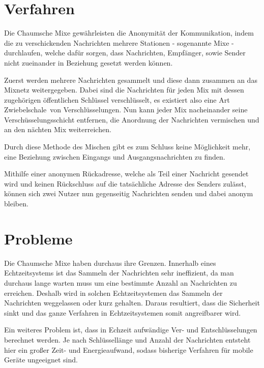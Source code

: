 \documentclass[
    fontsize=12pt,
    headings=small,
    parskip=half,           %
    bibliography=totoc,
    numbers=noenddot,       %
    open=any,               %
    final                   %
    ]{scrreprt}
\begin{document}
\section{Verfahren}

Die Chaumsche Mixe gewährleisten die Anonymität der
Kommunikation, indem die zu verschickenden Nachrichten mehrere Stationen - sogenannte
Mixe - durchlaufen, welche dafür sorgen, dass Nachrichten, Empfänger, sowie Sender nicht zueinander in Beziehung gesetzt werden können.

Zuerst werden mehrere Nachrichten gesammelt und diese dann zusammen an das Mixnetz weitergegeben.
Dabei sind die Nachrichten für jeden Mix mit dessen zugehörigen öffentlichen Schlüssel verschlüsselt, es existiert also eine Art \glqq Zwiebelschale\grqq ~von Verschlüsselungen.
Nun kann jeder Mix nacheinander seine Verschüsselungsschicht entfernen, die Anordnung der Nachrichten vermischen und an den nächten Mix weiterreichen.


Durch diese Methode des Mischen gibt es zum Schluss keine
Möglichkeit mehr, eine Beziehung zwischen Eingangs und Ausgangsnachrichten zu finden. 

Mithilfe einer anonymen Rückadresse, welche als Teil einer Nachricht gesendet wird und
keinen Rückschluss auf die tatsächliche Adresse des Senders zulässt, können sich
zwei Nutzer nun gegenseitig Nachrichten senden und dabei anonym bleiben.  \cite{Chaum:1981:UEM:358549.358563} \cite{sampigethaya2006survey}

\section{Probleme}

Die Chaumsche Mixe haben durchaus ihre Grenzen. Innerhalb eines Echtzeitsystems
ist das Sammeln der Nachrichten sehr ineffizient, da man durchaus lange warten
muss um eine bestimmte Anzahl an Nachrichten zu erreichen. Deshalb wird in solchen
Echtzeitsystemen das Sammeln der Nachrichten weggelassen oder kurz gehalten.
Daraus resultiert, dass die Sicherheit sinkt und das ganze Verfahren in
Echtzeitsystemen somit angreifbarer wird.

Ein weiteres Problem ist, dass in Echzeit aufwändige Ver- und Entschlüsselungen berechnet werden.
Je nach Schlüssellänge und Anzahl der Nachrichten entsteht hier ein großer Zeit- und Energieaufwand, sodass
bisherige Verfahren für mobile Geräte ungeeignet sind. \cite{Chaum:1981:UEM:358549.358563} \cite{sampigethaya2006survey}
\end{document}

